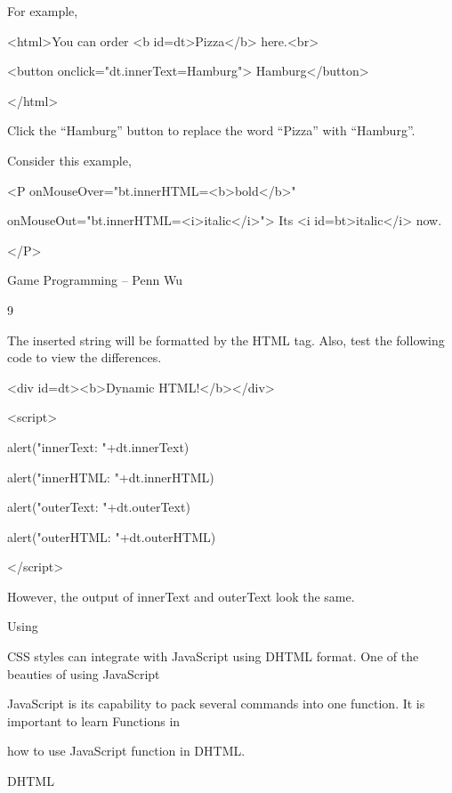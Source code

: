 \documentclass[
]{article}
\begin{document}
For example,

\textless html\textgreater You can order \textless b
id=dt\textgreater Pizza\textless/b\textgreater{}
here.\textless br\textgreater{}

\textless button
onclick="dt.innerText=\textquotesingle Hamburg\textquotesingle"\textgreater{}
Hamburg\textless/button\textgreater{}

\textless/html\textgreater{}

Click the ``Hamburg'' button to replace the word ``Pizza'' with
``Hamburg''.

Consider this example,

\textless P
onMouseOver="bt.innerHTML=\textquotesingle\textless b\textgreater bold\textless/b\textgreater\textquotesingle"

onMouseOut="bt.innerHTML=\textquotesingle\textless i\textgreater italic\textless/i\textgreater\textquotesingle"\textgreater{}
It\textquotesingle s \textless i
id=bt\textgreater italic\textless/i\textgreater{} now.

\textless/P\textgreater{}

Game Programming -- Penn Wu

9

\protect\hypertarget{index_split_001.htmlux5cux23p10}{}{}The inserted
string will be formatted by the HTML tag. Also, test the following code
to view the differences.

\textless div id=dt\textgreater\textless b\textgreater Dynamic
HTML!\textless/b\textgreater\textless/div\textgreater{}

\textless script\textgreater{}

alert("innerText: "+dt.innerText)

alert("innerHTML: "+dt.innerHTML)

alert("outerText: "+dt.outerText)

alert("outerHTML: "+dt.outerHTML)

\textless/script\textgreater{}

However, the output of innerText and outerText look the same.

Using

CSS styles can integrate with JavaScript using DHTML format. One of the
beauties of using JavaScript

JavaScript is its capability to pack several commands into one function.
It is important to learn Functions in

how to use JavaScript function in DHTML.

DHTML
\end{document}
